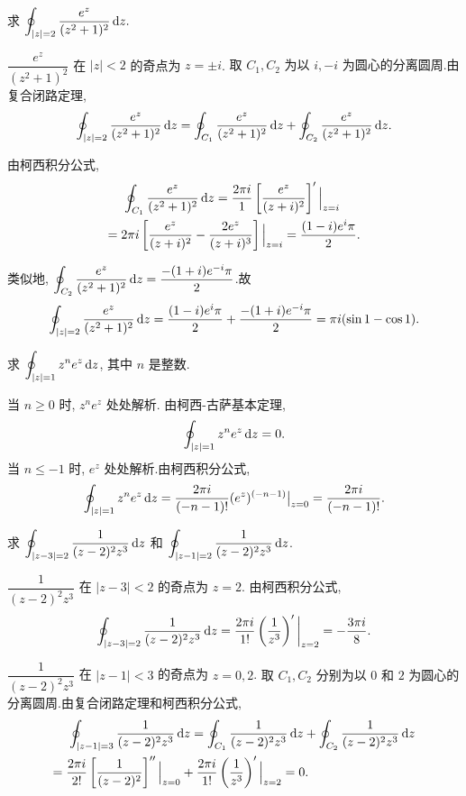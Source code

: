 \begin{example}
	求 $\displaystyle\oint_{|z|=2}\frac{e^z}{(z^2+1)^2}\,\mathrm{d} z.$
\end{example}

\begin{solution}
	$\dfrac{e^z}{(z^2+1)^2}$ 在 $|z|<2$ 的奇点为 $z=\pm i$.
	{取 $C_1,C_2$ 为以 $i,-i$ 为圆心的分离圆周.由复合闭路定理,
		\[\oint_{|z|=2}\frac{e^z}{(z^2+1)^2}\,\mathrm{d} z
		=\oint_{C_1}\frac{e^z}{(z^2+1)^2}\,\mathrm{d} z
		+\oint_{C_2}\frac{e^z}{(z^2+1)^2}\,\mathrm{d} z.\]}

	由柯西积分公式,
		\begin{align*}
		&\peq\oint_{C_1}\frac{e^z}{(z^2+1)^2}\diff z
		=\frac{2\pi i}{1}\left[\frac{e^z}{(z+i)^2}\right]'\Big|_{z=i}\\
		&{=2\pi i\left[\frac{e^z}{(z+i)^2}-\frac{2e^z}{(z+i)^3}\right]\Big|_{z=i}
		=\frac{(1-i)e^i\pi}2.}
		\end{align*}

	{类似地, $\displaystyle\oint_{C_2}\frac{e^z}{(z^2+1)^2}\,\mathrm{d} z=\frac{-(1+i)e^{-i}\pi}2$.故
		\[\oint_{|z|=2}\frac{e^z}{(z^2+1)^2}\,\mathrm{d} z
		=\frac{(1-i)e^i\pi}2+\frac{-(1+i)e^{-i}\pi}2
		=\pi i(\sin1-\cos1).\]}
\end{solution}

\begin{example}
	求 $\displaystyle\oint_{|z|=1}z^ne^z\,\mathrm{d} z$, 其中 $n$ 是整数.
\end{example}

\begin{solution}
	当 $n\ge 0$ 时, $z^ne^z$ 处处解析.
	{由柯西-古萨基本定理, 
		\[\oint_{|z|=1}z^ne^z\,\mathrm{d} z=0.\]当 $n\le-1$ 时, $e^z$ 处处解析.由柯西积分公式,
		\[\oint_{|z|=1}z^ne^z\,\mathrm{d} z
		=\frac{2\pi i}{(-n-1)!}(e^z)^{(-n-1)}\big|_{z=0}
		=\frac{2\pi i}{(-n-1)!}.\]}
\end{solution}

\begin{example}
	求 $\displaystyle\oint_{|z-3|=2}\frac1{(z-2)^2z^3}\,\mathrm{d} z$ 和 $\displaystyle\oint_{|z-1|=2}\frac1{(z-2)^2z^3}\,\mathrm{d} z$.
\end{example}

\begin{solution}
	 $\dfrac1{(z-2)^2z^3}$ 在 $|z-3|<2$ 的奇点为 $z=2$.
	{由柯西积分公式,
		\[\oint_{|z-3|=2}\frac1{(z-2)^2z^3}\,\mathrm{d} z
		=\frac{2\pi i}{1!}\left(\frac1{z^3}\right)'\bigg|_{z=2}
		=-\frac{3\pi i}8.\]}

	 $\dfrac1{(z-2)^2z^3}$ 在 $|z-1|<3$ 的奇点为 $z=0,2$.
	{取 $C_1,C_2$ 分别为以 $0$ 和 $2$ 为圆心的分离圆周.由复合闭路定理和柯西积分公式,
		\begin{align*}
		&\peq\oint_{|z-1|=3}\frac1{(z-2)^2z^3}\diff z=\oint_{C_1}\frac1{(z-2)^2z^3}\diff z+\oint_{C_2}\frac1{(z-2)^2z^3}\diff z\\
		&{=\frac{2\pi i}{2!}\left[\frac1{(z-2)^2}\right]''\Big|_{z=0}+\frac{2\pi i}{1!}\left(\frac1{z^3}\right)'\Big|_{z=2}=0.}
		\end{align*}}
\end{solution}

